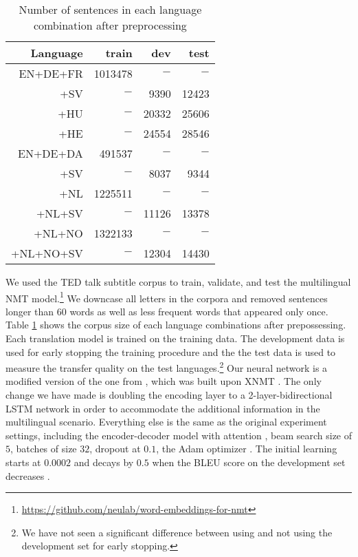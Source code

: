\documentclass[11pt,a4paper]{article}
\begin{document}
\begin{table}
  \centering
  \begin{tabular}{r|rrr}
    \hline
    Language & train & dev & test \\ [0.25ex]
    \hline\hline
    EN+DE+FR & 1013478 & $-$ & $-$ \\
    +SV & $-$ & 9390 & 12423 \\
    +HU & $-$ & 20332 & 25606 \\
    +HE & $-$ & 24554 & 28546 \\
    \hline
    EN+DE+DA & 491537 & $-$ & $-$ \\
    +SV & $-$ & 8037 & 9344 \\
    \hline
    +NL & 1225511 & $-$ & $-$ \\
    +NL+SV & $-$ & 11126 & 13378 \\
    \hline
    +NL+NO & 1322133 & $-$ & $-$ \\
    +NL+NO+SV & $-$ & 12304 & 14430 \\
    \hline
  \end{tabular}
  \caption{Number of sentences in each language combination after preprocessing}
  \label{table:corpus_size}
\end{table}
We used the TED talk subtitle corpus \citep{Qi:2018aa} to train, validate, and test the multilingual NMT model.\footnote{\url{https://github.com/neulab/word-embeddings-for-nmt}} 
We downcase all letters in the corpora and removed sentences longer than $60$ words as well as less frequent words that appeared only once.
Table \ref{table:corpus_size} shows the corpus size of each language combinations after prepossessing. Each translation model is trained on the training data. The development data is used for early stopping the training procedure and the the test data is used to measure the transfer quality on the test languages.\footnote{We have not seen a significant difference between using and not using the development set for early stopping.} 
Our neural network is a modified version of the one from \citet{Qi:2018aa}, which was built upon XNMT \cite{Neubig:2018aa}. The only change we have made is doubling the encoding layer to a 2-layer-bidirectional LSTM network in order to accommodate the additional information in the multilingual scenario. Everything else is the same as the original experiment settings, including the encoder-decoder model with attention \cite{Bahdanau:2014aa}, beam search size of $5$, batches of size $32$, dropout at $0.1$, the Adam optimizer \cite{Kingma:2014aa}. The initial learning starts at $0.0002$ and decays by $0.5$ when the BLEU score on the development set decreases \cite{Denkowski:2017aa}.
\end{document}
